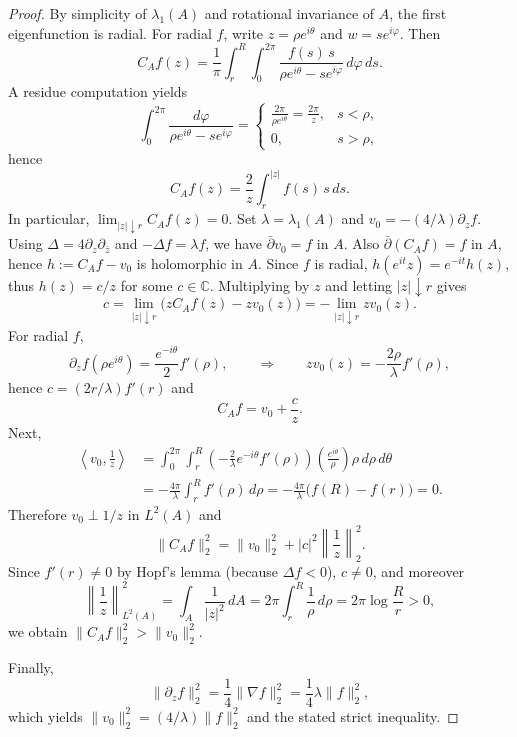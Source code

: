 \documentclass{amsart}
\newcommand{\C}{\mathbb{C}}
\theoremstyle{plain}
\theoremstyle{remark}
\begin{document}
\begin{proof}
By simplicity of $\lambda_1(A)$ and rotational invariance of $A$, the first eigenfunction is radial.
For radial $f$, write $z=\rho e^{i\theta}$ and $w=se^{i\varphi}$. Then
\[
C_A f(z)=\frac1\pi\int_r^R\int_0^{2\pi}\frac{f(s)\,s}{\rho e^{i\theta}-s e^{i\varphi}}\,d\varphi\,ds.
\]
A residue computation yields
\[
\int_0^{2\pi}\frac{d\varphi}{\rho e^{i\theta}-s e^{i\varphi}}
=
\begin{cases}
\displaystyle \frac{2\pi}{\rho e^{i\theta}}=\frac{2\pi}{z}, & s<\rho,\\[4pt]
0, & s>\rho,
\end{cases}
\]
hence
\[
C_A f(z)=\frac{2}{z}\int_r^{|z|} f(s)\,s\,ds.
\]
In particular, $\lim_{|z|\downarrow r}C_A f(z)=0$. Set $\lambda=\lambda_1(A)$ and
$v_0=-(4/\lambda)\partial_z f$. Using $\Delta=4\partial_z\partial_{\bar z}$ and $-\Delta f=\lambda f$,
we have $\bar\partial v_0=f$ in $A$. Also $\bar\partial(C_A f)=f$ in $A$, hence
$h:=C_A f-v_0$ is holomorphic in $A$. Since $f$ is radial, $h(e^{it}z)=e^{-it}h(z)$, thus $h(z)=c/z$
for some $c\in\C$. Multiplying by $z$ and letting $|z|\downarrow r$ gives
\[
c=\lim_{|z|\downarrow r}\bigl(zC_A f(z)-zv_0(z)\bigr)=-\lim_{|z|\downarrow r}zv_0(z).
\]
For radial $f$,
\[
\partial_z f(\rho e^{i\theta})=\frac{e^{-i\theta}}{2}f'(\rho),
\qquad\Rightarrow\qquad
zv_0(z)=-\frac{2\rho}{\lambda}f'(\rho),
\]
hence $c=(2r/\lambda)f'(r)$ and
\[
C_A f=v_0+\frac{c}{z}.
\]
Next,
\[\begin{split}
\left\langle v_0,\frac1z\right\rangle
&=\int_0^{2\pi}\int_r^R
\left(-\frac{2}{\lambda}e^{-i\theta}f'(\rho)\right)
\left(\frac{e^{i\theta}}{\rho}\right)\rho\,d\rho\,d\theta
\\&=-\frac{4\pi}{\lambda}\int_r^R f'(\rho)\,d\rho
=-\frac{4\pi}{\lambda}\bigl(f(R)-f(r)\bigr)=0.
\end{split}
\]
Therefore $v_0\perp 1/z$ in $L^2(A)$ and
\[
\|C_A f\|_2^2=\|v_0\|_2^2+|c|^2\left\|\frac1z\right\|_2^2.
\]
Since $f'(r)\neq 0$ by Hopf's lemma (because $\Delta f<0$), $c\neq 0$, and moreover
\[
\left\|\frac1z\right\|_{L^2(A)}^2=\int_A \frac{1}{|z|^2}\,dA
=2\pi\int_r^R \frac{1}{\rho}\,d\rho=2\pi\log\frac{R}{r}>0,
\]
we obtain $\|C_A f\|_2^2>\|v_0\|_2^2$.

Finally,
\[
\|\partial_z f\|_2^2=\frac14\|\nabla f\|_2^2
=\frac14\lambda\|f\|_2^2,
\]
which yields $\|v_0\|_2^2=(4/\lambda)\|f\|_2^2$ and the stated strict inequality.
\end{proof}
\end{document}
